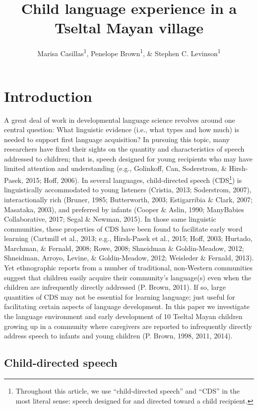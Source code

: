 \documentclass[floatsintext,man]{apa6}
\title{Child language experience in a Tseltal Mayan village}
\author{Marisa Casillas\textsuperscript{1}, Penelope Brown\textsuperscript{1}, \& Stephen C. Levinson\textsuperscript{1}}
\affiliation{
    \vspace{0.5cm}
          \textsuperscript{1} Max Planck Institute for Psycholinguistics  }
\theoremstyle{definition}
\theoremstyle{definition}
\theoremstyle{definition}
\theoremstyle{remark}
\begin{document}
\maketitle

\setcounter{secnumdepth}{0}



\section{Introduction}\label{intro}

A great deal of work in developmental language science revolves around
one central question: What linguistic evidence (i.e., what types and how
much) is needed to support first language acquisition? In pursuing this
topic, many researchers have fixed their sights on the quantity and
characteristics of speech addressed to children; that is, speech
designed for young recipients who may have limited attention and
understanding (e.g., Golinkoff, Can, Soderstrom, \& Hirsh-Pasek, 2015;
Hoff, 2006). In several languages, child-directed speech (CDS\footnote{Throughout
  this article, we use \enquote{child-directed speech} and \enquote{CDS}
  in the most literal sense: speech designed for and directed toward a
  child recipient.}) is linguistically accommodated to young listeners
(Cristia, 2013; Soderstrom, 2007), interactionally rich (Bruner, 1985;
Butterworth, 2003; Estigarribia \& Clark, 2007; Masataka, 2003), and
preferred by infants (Cooper \& Aslin, 1990; ManyBabies Collaborative,
2017; Segal \& Newman, 2015). In those same linguistic communities,
these properties of CDS have been found to facilitate early word
learning (Cartmill et al., 2013; e.g., Hirsh-Pasek et al., 2015; Hoff,
2003; Hurtado, Marchman, \& Fernald, 2008; Rowe, 2008; Shneidman \&
Goldin-Meadow, 2012; Shneidman, Arroyo, Levine, \& Goldin-Meadow, 2012;
Weisleder \& Fernald, 2013). Yet ethnographic reports from a number of
traditional, non-Western communities suggest that children easily
acquire their community's language(s) even when the children are
infrequently directly addressed (P. Brown, 2011). If so, large
quantities of CDS may not be essential for learning language; just
useful for facilitating certain aspects of language development. In this
paper we investigate the language environment and early development of
10 Tseltal Mayan children growing up in a community where caregivers are
reported to infrequently directly address speech to infants and young
children (P. Brown, 1998, 2011, 2014).

\subsection{Child-directed speech}\label{intro-cds}
\end{document}
